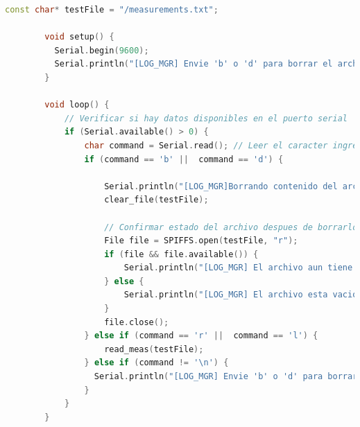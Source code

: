 \begin{itemize}
\begin{lstlisting}[captionpos=b, caption={Programa lectura o eliminación de fichero}, language=c++]
        const char* testFile = "/measurements.txt";

        void setup() {
          Serial.begin(9600);
          Serial.println("[LOG_MGR] Envie 'b' o 'd' para borrar el archivo y 'r' o 'l' para leerlo ");
        }

        void loop() {
            // Verificar si hay datos disponibles en el puerto serial
            if (Serial.available() > 0) {
                char command = Serial.read(); // Leer el caracter ingresado
                if (command == 'b' ||  command == 'd') {

                    Serial.println("[LOG_MGR]Borrando contenido del archivo...");
                    clear_file(testFile);

                    // Confirmar estado del archivo despues de borrarlo
                    File file = SPIFFS.open(testFile, "r");
                    if (file && file.available()) {
                        Serial.println("[LOG_MGR] El archivo aun tiene contenido.");
                    } else {
                        Serial.println("[LOG_MGR] El archivo esta vacio.");
                    }
                    file.close();
                } else if (command == 'r' ||  command == 'l') {
                    read_meas(testFile);
                } else if (command != '\n') {
                  Serial.println("[LOG_MGR] Envie 'b' o 'd' para borrar el archivo y 'r' o 'l' para leerlo ");
                }
            }
        }
    \end{lstlisting}
\end{itemize}

